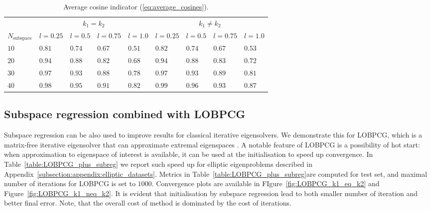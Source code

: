 \documentclass{article}
\begin{document}
\begin{table}[h!]
\caption{Average cosine indicator (\ref{eq:average_cosines}).}
\label{table:average_cosines_smoothness}
\begin{center}
\hspace*{-0.5cm}  
\begin{tabular}{lllllllll}
\toprule
& \multicolumn{4}{c}{$k_1=k_2$} &  \multicolumn{4}{c}{$k_1\neq k_2$}\\
\cmidrule(r){2-5}\cmidrule(r){6-9}
$N_{\text{subspace}}$ & $l=0.25$ & $l=0.5$ & $l=0.75$ & $l=1.0$ & $l=0.25$ & $l=0.5$ & $l=0.75$ & $l=1.0$ \\
\midrule
$10$ & $0.81$ & $0.74$ & $0.67$ & $0.51$ &  $0.82$ & $0.74$ & $0.67$ & $0.53$\\
$20$ & $0.94$ & $0.88$ & $0.82$ & $0.68$ &  $0.94$ & $0.88$ & $0.83$ & $0.72$\\
$30$ & $0.97$ & $0.93$ & $0.88$ & $0.78$ &  $0.97$ & $0.93$ & $0.89$ & $0.81$\\
$40$ & $0.98$ & $0.95$ & $0.91$ & $0.82$ &  $0.99$ & $0.96$ & $0.93$ & $0.87$\\
\bottomrule
\end{tabular}
\end{center}
\end{table}

\subsection{Subspace regression combined with LOBPCG}
\label{appendix:LOBPCG_results}
Subspace regression can be also used to improve results for classical iterative eigensolvers. We demonstrate this for LOBPCG, which is a matrix-free iterative eigensolver that can approximate extremal eigenspaces \cite{knyazev2001toward}. A notable feature of LOBPCG is a possibility of hot start: when approximation to eigenspace of interest is available, it can be used at the initialisation to speed up convergence. In Table~\ref{table:LOBPCG_plus_subreg} we report such speed up for elliptic eigenproblems described in Appendix~\ref{subsection:appendix:elliptic_datasets}. Metrics in Table~\ref{table:LOBPCG_plus_subreg}are computed for test set, and maximal number of iterations for LOBPCG is set to $1000$. Convergence plots are available in FIgure~\ref{fig:LOBPCG_k1_eq_k2} and Figure~\ref{fig:LOBPCG_k1_neq_k2}. It is evident that initialisation by subspace regression lead to both smaller number of iteration and better final error. Note, that the overall cost of method is dominated by the cost of iterations.
\end{document}

